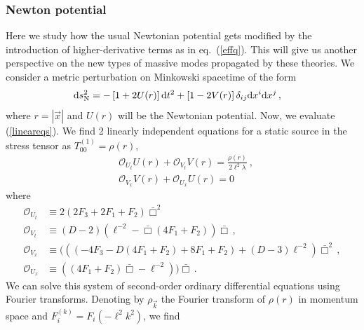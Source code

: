 \documentclass[11pt]{article}
\newcommand{\req}[1]{(\ref{#1})} %
\renewcommand{\req}[1]{eq.~(\ref{#1})}
\newcommand{\rmd}{\mathrm d}
\newcommand{\comment}[1]{{\bf [[[#1]]]}}
\begin{document}
\subsubsection{Newton potential}
Here we study how the usual Newtonian potential gets modified by the introduction of higher-derivative terms as in \req{effq}. This will give us another perspective on the new types of massive modes propagated by these theories. We consider a metric perturbation on Minkowski spacetime of the form
\begin{equation}
\begin{aligned}\label{Nmetric}
    \rmd s^2_{\rm N}&=-\left[ 1+2U( r )\right]\rmd t^2+\left[1-2V( r )\right]\delta_{ij}\rmd x^i\rmd x^j\,,
\end{aligned}
\end{equation}
where $r=|\vec{x}|$ and $U( r )$ will be the Newtonian potential. Now, we evaluate (\ref{lineareqs}). We find 2 linearly independent equations for a static source in the stress tensor as $T_{00}^{(1)}=\rho(r)$,
\begin{equation}\label{eq: EOM non rel}
    \begin{aligned}
    &\mathcal{O}_{U_t} U(r)+\mathcal{O}_{V_t} V(r) =\frac{\rho(r)}{2\ell^2\lambda}~,\\
   &\mathcal{O}_{V_x} V(r)+ \mathcal{O}_{U_x}U(r)=0
\end{aligned}
\end{equation}
where
\begin{equation}
    \begin{aligned}
        \mathcal{O}_{U_t}&\equiv 2 (2F_3+2 F_1+F_2)\bar\Box ^2\, \\
        \mathcal{O}_{V_t}&\equiv(D-2)(\ell^{-2}-\bar\Box  (4 F_1+F_2))\bar\Box\, ,\\
        \mathcal{O}_{V_x}&\equiv(((-4 F_3-D (4 F_1+F_2)+8 F_1+F_2)+(D-3)\ell^{-2})\bar\Box^2\, ,\\
        \mathcal{O}_{U_x}&\equiv((4F_1+F_2)\bar\Box-\ell^{-2}))\bar\Box\, . 
    \end{aligned}
\end{equation}
We can solve this system of second-order ordinary differential equations using Fourier transforms. Denoting by $\rho_{\vec{k}}$ the Fourier transform of $\rho(r)$ in momentum space and $F_{i}^{(k)}=F_i(-\ell^2k^2)$, we find
\end{document}
